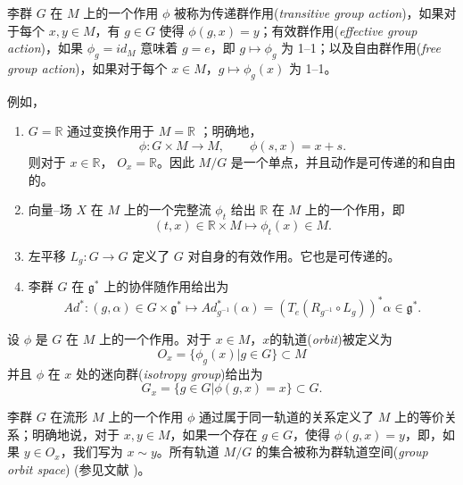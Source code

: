 \documentclass[11pt,fontset=founder]{ctexart}
\begin{document}
李群 $G$ 在 $M$ 上的一个作用 $\phi$ 被称为传递群作用(\textit{transitive group action})，如果对于每个 $x,y\in M$，有 $g\in G$ 使得 $\phi (g,x)=y$；有效群作用(\textit{effective group action})，如果 $\phi _{g}=id_{M}$ 意味着 $g=e$，即 $g\mapsto \phi _{g}$ 为 1--1；以及自由群作用(\textit{free group action})，如果对于每个 $x\in M$，$g\mapsto \phi _{g}(x)$ 为 1--1。

例如，

\begin{enumerate}
\item $G=\mathbb{R}$ 通过变换作用于 $M=\mathbb{R}$ ；明确地，
\begin{equation*}
\phi :G\times M\rightarrow M,\qquad \phi (s,x)=x+s.
\end{equation*}
则对于 $x\in \mathbb{R}$， $O_{x}=\mathbb{R}$。因此 $M/G$ 是一个单点，并且动作是可传递的和自由的。

\item 向量–场 $X$ 在 $M$ 上的一个完整流 $\phi _{t}$ 给出 $\mathbb{R}$ 在 $M$ 上的一个作用，即
\begin{equation*}
(t,x)\in \mathbb{R}\times M\mapsto \phi _{t}(x)\in M.
\end{equation*}

\item 左平移 $L_{g}:G\rightarrow G$ 定义了 $G$ 对自身的有效作用。它也是可传递的。

\item 李群 $G$ 在 $\mathfrak{g}^{\ast }$ 上的协伴随作用给出为
\begin{equation*}
Ad^{\ast }:(g,\alpha )\in G\times \mathfrak{g}^{\ast }\mapsto
Ad_{g^{-1}}^{\ast }(\alpha )=\left( T_{e}(R_{g^{-1}}\circ L_{g})\right)
^{\ast }\alpha \in \mathfrak{g}^{\ast }.
\end{equation*}
\end{enumerate}

设 $\phi $ 是 $G$ 在 $M$ 上的一个作用。对于 $x\in M$，$x $的轨道(\emph{orbit})被定义为
\begin{equation*}
O_{x}=\{\phi _{g}(x)|g\in G\}\subset M
\end{equation*}
并且 $\phi $ 在 $x$ 处的迷向群(\textit{isotropy group})给出为
\begin{equation*}
G_{x}=\{g\in G|\phi (g,x)=x\}\subset G.
\end{equation*}

李群 $G$ 在流形 $M$ 上的一个作用 $\phi $ 通过属于同一轨道的关系定义了 $M$ 上的等价关系；明确地说，对于 $x,y\in M $，如果一个存在 $g\in G$，使得 $\phi (g,x)=y$，即，如果 $y\in O_{x}$，我们写为 $x\sim y$。所有轨道 $M/G$ 的集合被称为群轨道空间(\textit{group orbit space}) (参见文献 \cite{Arnold,Abraham,GaneshSprBig,GaneshADG})。
\end{document}
